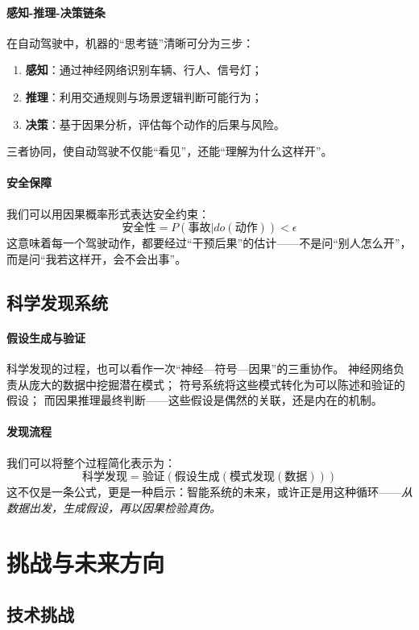 \paragraph{感知-推理-决策链条}
在自动驾驶中，机器的“思考链”清晰可分为三步：  
\begin{enumerate}
\item \textbf{感知}：通过神经网络识别车辆、行人、信号灯；  
\item \textbf{推理}：利用交通规则与场景逻辑判断可能行为；  
\item \textbf{决策}：基于因果分析，评估每个动作的后果与风险。  
\end{enumerate}
三者协同，使自动驾驶不仅能“看见”，还能“理解为什么这样开”。

\paragraph{安全保障}
我们可以用因果概率形式表达安全约束：  
$$\text{安全性} = P(\text{事故}|do(\text{动作})) < \epsilon$$
这意味着每一个驾驶动作，都要经过“干预后果”的估计——不是问“别人怎么开”，而是问“我若这样开，会不会出事”。

\subsection{科学发现系统}

\paragraph{假设生成与验证}
科学发现的过程，也可以看作一次“神经—符号—因果”的三重协作。  
神经网络负责从庞大的数据中挖掘潜在模式；  
符号系统将这些模式转化为可以陈述和验证的假设；  
而因果推理最终判断——这些假设是偶然的关联，还是内在的机制。

\paragraph{发现流程}
我们可以将整个过程简化表示为：  
$$\text{科学发现} = \text{验证}(\text{假设生成}(\text{模式发现}(\text{数据})))$$
这不仅是一条公式，更是一种启示：智能系统的未来，或许正是用这种循环——\emph{从数据出发，生成假设，再以因果检验真伪。}

\section{挑战与未来方向}

\subsection{技术挑战}

